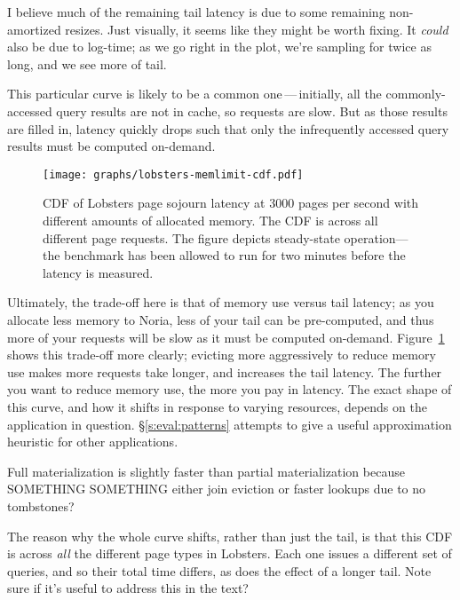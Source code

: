 \begin{inprogress}
  I believe much of the remaining tail latency is due to some remaining
  non-amortized resizes. Just visually, it seems like they might be worth
  fixing. It \emph{could} also be due to log-time; as we go right in the plot,
  we're sampling for twice as long, and we see more of tail.
\end{inprogress}

This particular curve is likely to be a common one\,---\,initially, all the
commonly-accessed query results are not in cache, so requests are slow. But
as those results are filled in, latency quickly drops such that only the
infrequently accessed query results must be computed on-demand.

\begin{figure}[h]
  \centering
  \texttt{[image: graphs/lobsters-memlimit-cdf.pdf]}
  \caption{CDF of Lobsters page sojourn latency at 3000 pages per second with
  different amounts of allocated memory. The CDF is across all different page
  requests. The figure depicts steady-state operation---the benchmark has been
  allowed to run for two minutes before the latency is measured.}
  \label{f:lobsters-mem-latency}
\end{figure}

Ultimately, the trade-off here is that of memory use versus tail latency; as you
allocate less memory to Noria, less of your tail can be pre-computed, and thus
more of your requests will be slow as it must be computed on-demand.
Figure~\ref{f:lobsters-mem-latency} shows this trade-off more clearly;
evicting more aggressively to reduce memory use makes more requests take longer,
and increases the tail latency. The further you want to reduce memory use, the
more you pay in latency. The exact shape of this curve, and how it shifts in
response to varying resources, depends on the application in question.
\S\ref{s:eval:patterns} attempts to give a useful approximation heuristic for
other applications.

\begin{inprogress}
Full materialization is slightly faster than partial materialization because
SOMETHING SOMETHING either join eviction or faster lookups due to no tombstones?
\end{inprogress}

\begin{inprogress}
The reason why the whole curve shifts, rather than just the tail, is that this
CDF is across \emph{all} the different page types in Lobsters. Each one issues a
different set of queries, and so their total time differs, as does the effect of
a longer tail. Note sure if it's useful to address this in the text?
\end{inprogress}

